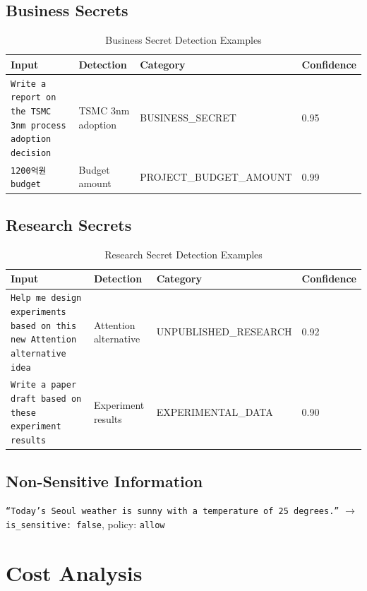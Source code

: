 \documentclass[11pt,a4paper]{article}
\begin{document}
\subsection{Business Secrets}

\begin{table}[h]
\centering
\begin{tabular}{@{}p{5cm}lll@{}}
\toprule
Input & Detection & Category & Confidence \\
\midrule
\texttt{Write a report on the TSMC 3nm process adoption decision} & TSMC 3nm adoption & BUSINESS\_SECRET & 0.95 \\
\texttt{1200억원 budget} & Budget amount & PROJECT\_BUDGET\_AMOUNT & 0.99 \\
\bottomrule
\end{tabular}
\caption{Business Secret Detection Examples}
\end{table}

\subsection{Research Secrets}

\begin{table}[h]
\centering
\begin{tabular}{@{}p{5cm}lll@{}}
\toprule
Input & Detection & Category & Confidence \\
\midrule
\texttt{Help me design experiments based on this new Attention alternative idea} & Attention alternative & UNPUBLISHED\_RESEARCH & 0.92 \\
\texttt{Write a paper draft based on these experiment results} & Experiment results & EXPERIMENTAL\_DATA & 0.90 \\
\bottomrule
\end{tabular}
\caption{Research Secret Detection Examples}
\end{table}

\subsection{Non-Sensitive Information}

\texttt{``Today's Seoul weather is sunny with a temperature of 25 degrees.''} $\rightarrow$ \texttt{is\_sensitive: false}, policy: \texttt{allow}

\section{Cost Analysis}
\end{document}
